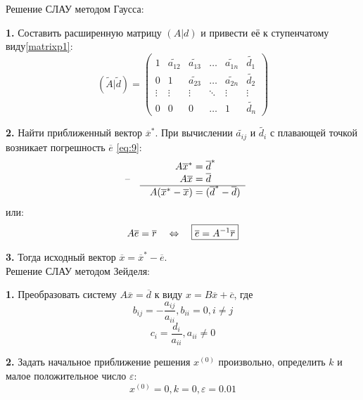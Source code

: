 \documentclass[a4paper, 12pt]{article}   	%
\begin{document}
Решение СЛАУ методом Гаусса:

\textbf{1.}  Составить расширенную матрицу $(A|d)$ и привести её к ступенчатому виду\eqref{matrixp1}:
\begin{equation}\label{matrixp1}
 (\widetilde{A}|\widetilde{d})=\left(\begin{array}{ccccc|c} 
1 & \widetilde{a_{12}} & \widetilde{a_{13}} & \ldots &\widetilde{a_{1n}} & \widetilde{d_{1}} \\ 
0 & 1 & \widetilde{a_{23}} & \ldots &\widetilde{a_{2n}} & \widetilde{d_{2}} \\ 
  \vdots  & \vdots  & \vdots & \ddots & \vdots  & \vdots\\
 0 & 0 & 0 & \ldots& 1 & \widetilde{d_{n}} 
\end{array}\right)
\end{equation}


\textbf{2.} Найти приближенный вектор $\overline{x}^*$. При вычислении $\widetilde{a_{ij}}$ и $\widetilde{d_i}$ с плавающей точкой возникает погрешность $\overline{e}$ \eqref{eq:9}:
\[
  \begin{array}{l@{\quad}cr@{}l}
    && A\overline{x}^* & {}= \overline{d}^* \\
    \text{--} && A\overline{x} & {}= \overline{d} \\ \cline{2-4}
    && A(\overline{x}^*-\overline{x}) & {}= (\overline{d}^*-\overline{d})
  \end{array}
\]
или:
\begin{equation}\label{eq:9}
 A\overline{e} = \overline{r} \\
  \quad
  \Leftrightarrow
  \quad 
   \boxed{\overline{e} = A^{-1} \overline{r}} 
\end{equation}

\textbf{3.} Тогда исходный вектор $ \overline{x} = \overline{x}^* - \overline{e}$.
\\

Решение СЛАУ методом Зейделя:

\textbf{1.} Преобразовать систему $A\overline{x}=\overline{d}$ к виду $x = B\overline{x} + \overline{c}$, где
\begin{equation*}
b_{ij}=-\frac{a_{ij}}{a_{ii}}, b_{ii} = 0, i \neq j
\end{equation*}
\begin{equation*}
c_i = \frac{d_i}{a_{ii}}, a_{ii} \neq 0
\end{equation*}

\textbf{2.} Задать начальное приближение решения $x^{(0)}$ произвольно, определить $k$ и малое положительное число $\varepsilon$:
\begin{equation*}
x^{(0)} = 0, k = 0, \varepsilon = 0.01
\end{equation*}
\end{document}
